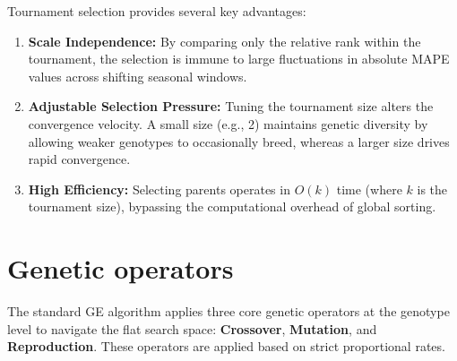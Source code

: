\documentclass[12pt]{article}
\begin{document}
    Tournament selection provides several key advantages:
    \begin{enumerate}
        \item \textbf{Scale Independence:} By comparing only the relative rank within the tournament, the selection is immune to large fluctuations in absolute MAPE values across shifting seasonal windows.
        \item \textbf{Adjustable Selection Pressure:} Tuning the tournament size alters the convergence velocity. A small size (e.g., 2) maintains genetic diversity by allowing weaker genotypes to occasionally breed, whereas a larger size drives rapid convergence.
        \item \textbf{High Efficiency:} Selecting parents operates in $O(k)$ time (where $k$ is the tournament size), bypassing the computational overhead of global sorting.
    \end{enumerate}

\section{Genetic operators}
    The standard GE algorithm applies three core genetic operators at the genotype level to navigate the flat search space: \textbf{Crossover}, \textbf{Mutation}, and \textbf{Reproduction}. These operators are applied based on strict proportional rates.
\end{document}
